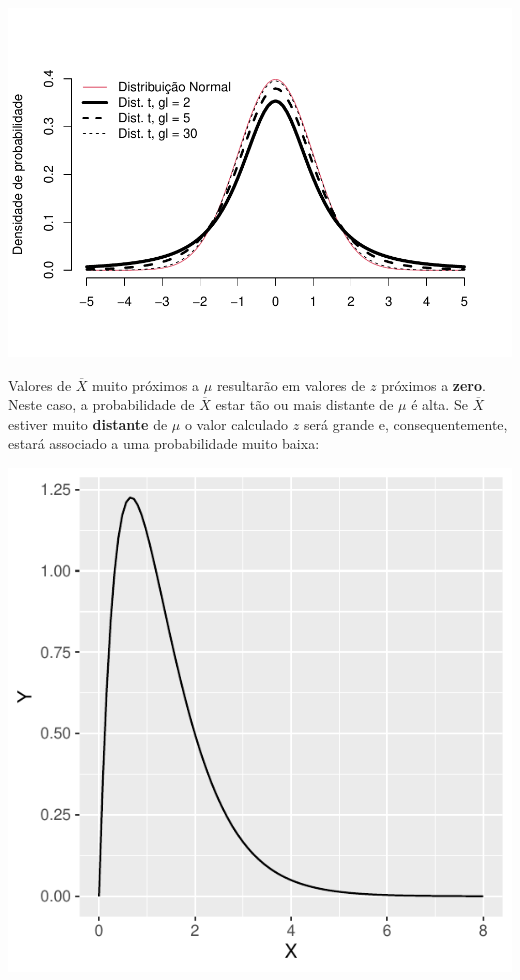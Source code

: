\documentclass[
]{book}
\begin{document}
\begin{center}\includegraphics{probest-cambientais_files/figure-latex/unnamed-chunk-127-1} \end{center}

Valores de \(\overline{X}\) muito próximos a \(\mu\) resultarão em valores de \(z\) próximos a \textbf{zero}. Neste caso, a probabilidade de \(\overline{X}\) estar tão ou mais distante de \(\mu\) é alta. Se \(\overline{X}\) estiver muito \textbf{distante} de \(\mu\) o valor calculado \(z\) será grande e, consequentemente, estará associado a uma probabilidade muito baixa:

\begin{center}\includegraphics{probest-cambientais_files/figure-latex/unnamed-chunk-128-1} \end{center}
\end{document}
